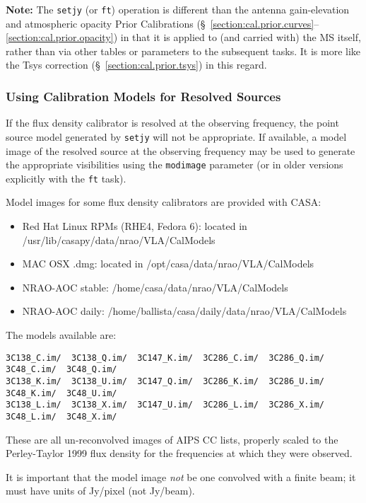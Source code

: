 {\bf Note:} The {\tt setjy} (or {\tt ft}) operation is different than
the antenna gain-elevation and atmospheric opacity Prior Calibrations 
(\S~\ref{section:cal.prior.curves}--\ref{section:cal.prior.opacity})
in that it is applied to (and carried with) the MS itself, rather than
via other tables or parameters to the subsequent tasks.  It is more
like the Tsys correction (\S~\ref{section:cal.prior.tsys}) in this regard.

\subsubsection{Using Calibration Models for Resolved Sources}
\label{section:cal.prior.models.resolved}

If the flux density calibrator is resolved at the observing frequency,
the point source model generated by {\tt setjy} will not be
appropriate.  If available, a model image of the resolved source at
the observing frequency may be used to generate the appropriate
visibilities using the {\tt modimage} parameter (or in older
versions explicitly with the {\tt ft} task). 

Model images for some flux density calibrators are provided with CASA:
\begin{itemize}
   \item Red Hat Linux RPMs (RHE4, Fedora 6): 
         located in /usr/lib/casapy/data/nrao/VLA/CalModels
   \item MAC OSX .dmg: located in /opt/casa/data/nrao/VLA/CalModels
   \item NRAO-AOC stable: /home/casa/data/nrao/VLA/CalModels
   \item NRAO-AOC daily: /home/ballista/casa/daily/data/nrao/VLA/CalModels
\end{itemize}

The models available are:
\small
\begin{verbatim}
3C138_C.im/  3C138_Q.im/  3C147_K.im/  3C286_C.im/  3C286_Q.im/  3C48_C.im/  3C48_Q.im/ 
3C138_K.im/  3C138_U.im/  3C147_Q.im/  3C286_K.im/  3C286_U.im/  3C48_K.im/  3C48_U.im/
3C138_L.im/  3C138_X.im/  3C147_U.im/  3C286_L.im/  3C286_X.im/  3C48_L.im/  3C48_X.im/
\end{verbatim}
\normalsize
These are all un-reconvolved images of AIPS CC lists, properly scaled
to the Perley-Taylor 1999 flux density for the frequencies at which 
they were observed.

It is important that the model image {\em not} be one
convolved with a finite beam; it must have units of Jy/pixel (not
Jy/beam).  

